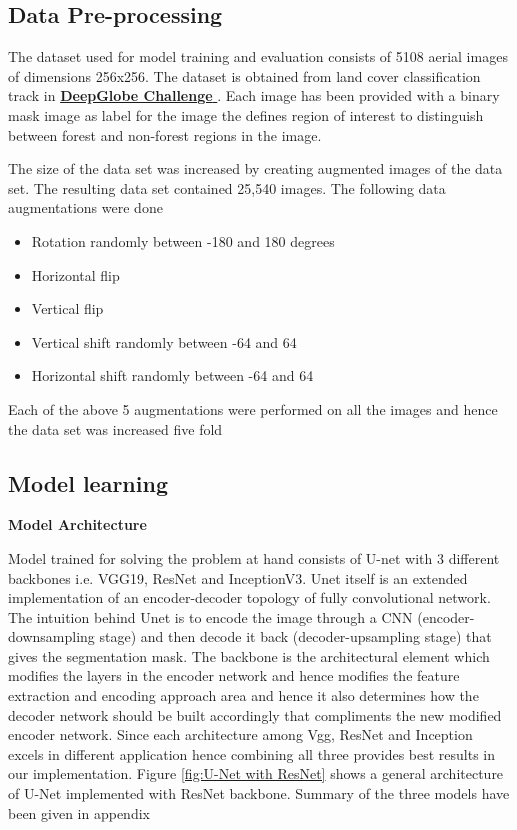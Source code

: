 \documentclass[rnd]{mas_proposal}
\begin{document}
\subsection{Data Pre-processing}

The dataset used for model training and evaluation consists of  5108 aerial images of dimensions 256x256. The dataset is obtained from land cover 
classification track in \href{https://www.kaggle.com/balraj98/deepglobe-land-cover-classification-dataset}{\textbf{DeepGlobe Challenge }}
. Each image has been provided with a binary mask image as label for the image the defines region of interest to distinguish between forest and non-forest regions 
in the image.

The size of the data set was increased by creating augmented images of the data set. The resulting data set contained 25,540 images. The following data augmentations 
were done 
\begin{itemize}
        \item Rotation randomly between -180 and 180 degrees
        \item Horizontal flip
        \item Vertical flip
        \item Vertical shift randomly between -64 and 64
        \item Horizontal shift randomly between -64 and 64
\end{itemize}

Each of the above 5 augmentations were performed on all the images and hence the data set was increased five fold

\subsection{Model learning}

\textbf{Model Architecture}
\vspace{20px}


Model trained for solving the problem at hand consists of U-net with 3 different backbones i.e. VGG19, ResNet and InceptionV3. Unet itself is an extended 
implementation of an encoder-decoder topology of  fully convolutional network. The intuition behind Unet is to encode the image through 
a CNN (encoder-downsampling stage) and then decode it back (decoder-upsampling stage) that gives the segmentation mask.  The backbone is the architectural
 element which modifies the layers in the encoder network and hence modifies the feature extraction and encoding approach area and hence it also determines how 
 the decoder network should be built accordingly that compliments the new modified encoder network.
Since each architecture among Vgg, ResNet and Inception excels in different application hence combining all three provides best results in our implementation. 
Figure \ref{fig:U-Net with ResNet} shows a general architecture of U-Net implemented with ResNet backbone. Summary of the three models have been given in appendix
\end{document}
